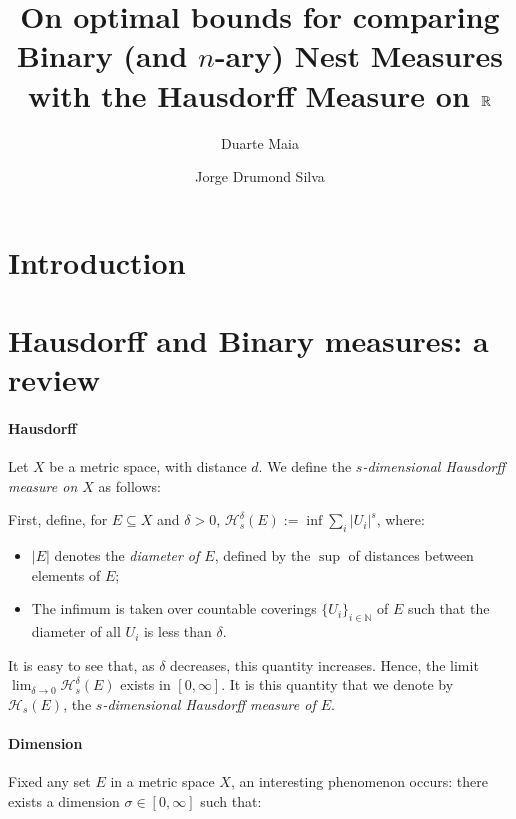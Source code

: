 \documentclass[11pt]{amsart}
\title{\textbf{On optimal bounds for comparing Binary (and $n$-ary) Nest Measures with the Hausdorff Measure on $\mathbb{R}$}}
\author{Duarte Maia}
\author{Jorge Drumond Silva}
\date{}
\newcommand{\N}{\mathbb{N}}
\newcommand{\HH}{\mathcal{H}}
\begin{document}
\begin{abstract}
\lipsum[1]
\end{abstract}

\maketitle


\section{Introduction}

\lipsum[1]

\section{Hausdorff and Binary measures: a review}

\paragraph{Hausdorff}

Let $X$ be a metric space, with distance $d$. We define the \emph{$s$-dimensional Hausdorff measure on $X$} as follows:

First, define, for $E \subseteq X$ and $\delta > 0$, $\HH_s^\delta(E) := \inf \sum_i \lvert U_i \rvert^s$, where:

\begin{itemize}

\item $\lvert E \rvert$ denotes the \emph{diameter of $E$}, defined by the $\sup$ of distances between elements of $E$;

\item The infimum is taken over countable coverings $\{U_i\}_{i \in \N}$ of $E$ such that the diameter of all $U_i$ is less than $\delta$.

\end{itemize}

It is easy to see that, as $\delta$ decreases, this quantity increases. Hence, the limit $\lim_{\delta \to 0} \HH_s^\delta(E)$ exists in $\left[ 0, \infty \right]$. It is this quantity that we denote by $\HH_s(E)$, the \emph{$s$-dimensional Hausdorff measure of $E$}.

\paragraph{Dimension}

Fixed any set $E$ in a metric space $X$, an interesting phenomenon occurs: there exists a dimension $\sigma \in \left[0, \infty\right]$ such that:
\end{document}

